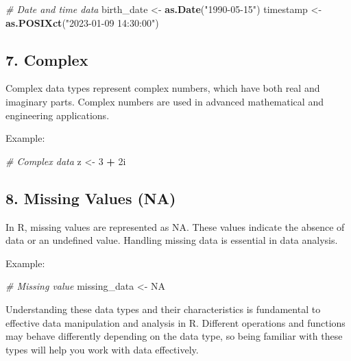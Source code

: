 \documentclass[
]{book}
\newenvironment{Shaded}{\begin{snugshade}}{\end{snugshade}}
\newcommand{\CommentTok}[1]{\textcolor[rgb]{0.56,0.35,0.01}{\textit{#1}}}
\newcommand{\ConstantTok}[1]{\textcolor[rgb]{0.56,0.35,0.01}{#1}}
\newcommand{\DecValTok}[1]{\textcolor[rgb]{0.00,0.00,0.81}{#1}}
\newcommand{\FunctionTok}[1]{\textcolor[rgb]{0.13,0.29,0.53}{\textbf{#1}}}
\newcommand{\NormalTok}[1]{#1}
\newcommand{\OtherTok}[1]{\textcolor[rgb]{0.56,0.35,0.01}{#1}}
\newcommand{\SpecialCharTok}[1]{\textcolor[rgb]{0.81,0.36,0.00}{\textbf{#1}}}
\newcommand{\StringTok}[1]{\textcolor[rgb]{0.31,0.60,0.02}{#1}}
\begin{document}
\begin{Shaded}
\begin{Highlighting}[]
\CommentTok{\# Date and time data}
\NormalTok{birth\_date }\OtherTok{\textless{}{-}} \FunctionTok{as.Date}\NormalTok{(}\StringTok{"1990{-}05{-}15"}\NormalTok{)}
\NormalTok{timestamp }\OtherTok{\textless{}{-}} \FunctionTok{as.POSIXct}\NormalTok{(}\StringTok{"2023{-}01{-}09 14:30:00"}\NormalTok{)}
\end{Highlighting}
\end{Shaded}

\hypertarget{complex}{%
\subsection{7. Complex}\label{complex}}

Complex data types represent complex numbers, which have both real and imaginary parts. Complex numbers are used in advanced mathematical and engineering applications.

Example:

\begin{Shaded}
\begin{Highlighting}[]
\CommentTok{\# Complex data}
\NormalTok{z }\OtherTok{\textless{}{-}} \DecValTok{3} \SpecialCharTok{+}\NormalTok{ 2i}
\end{Highlighting}
\end{Shaded}

\hypertarget{missing-values-na}{%
\subsection{8. Missing Values (NA)}\label{missing-values-na}}

In R, missing values are represented as NA. These values indicate the absence of data or an undefined value. Handling missing data is essential in data analysis.

Example:

\begin{Shaded}
\begin{Highlighting}[]
\CommentTok{\# Missing value}
\NormalTok{missing\_data }\OtherTok{\textless{}{-}} \ConstantTok{NA}
\end{Highlighting}
\end{Shaded}

Understanding these data types and their characteristics is fundamental to effective data manipulation and analysis in R. Different operations and functions may behave differently depending on the data type, so being familiar with these types will help you work with data effectively.
\end{document}
